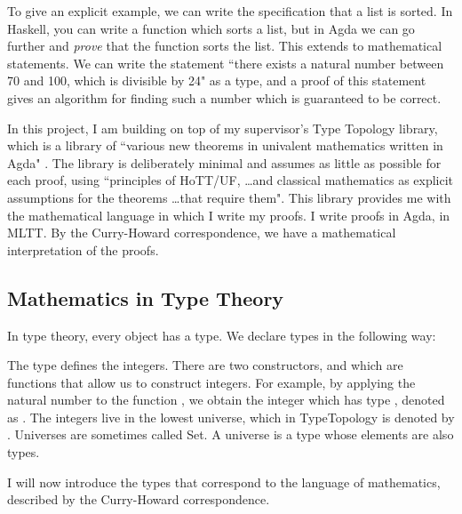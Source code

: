 \documentclass[ProjectReport]{subfiles}
\begin{document}
To give an explicit example, we can write the specification that a list is sorted. In Haskell, you can write a function which sorts a list, but in Agda we can go further and \textit{prove} that the function sorts the list. This extends to mathematical statements. We can write the statement ``there exists a natural number between 70 and 100, which is divisible by 24" as a type, and a proof of this statement gives an algorithm for finding such a number which is guaranteed to be correct.

In this project, I am building on top of my supervisor's Type Topology library, which is a library of ``various new theorems in univalent mathematics written in Agda" \cite{TypeTopology}. The library is deliberately minimal and assumes as little as possible for each proof, using ``principles of HoTT/UF, \ldots and classical mathematics as explicit assumptions for the theorems \ldots that require them". This library provides me with the mathematical language in which I write my proofs. I write proofs in Agda, in MLTT. By the Curry-Howard correspondence, we have a mathematical interpretation of the proofs.

\subsection{Mathematics in Type Theory}

In type theory, every object has a type. We declare types in the following way:

\TypeExample

The type  defines the integers. There are two constructors,  and  which are functions that allow us to construct integers. For example, by applying the natural number  to the function , we obtain the integer \AgdaSpace{} which has type , denoted as
\AgdaSpace{}%
\AgdaSymbol{:}\AgdaSpace{}%
.
The integers live in the lowest universe, which in TypeTopology is denoted by . Universes are sometimes called Set. A universe is a type whose elements are also types.

I will now introduce the types that correspond to the language of mathematics, described by the Curry-Howard correspondence. 
\end{document}
